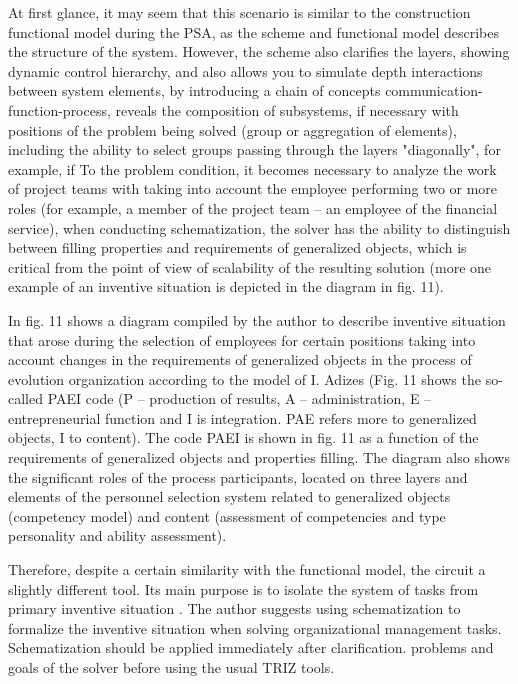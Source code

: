 At first glance, it may seem that this scenario is similar to the construction
functional model during the PSA, as the scheme and functional model describes
the structure of the system. However, the scheme also clarifies the layers,
showing dynamic control hierarchy, and also allows you to simulate depth
interactions between system elements, by introducing a chain of concepts
communication-function-process, reveals the composition of subsystems, if
necessary with positions of the problem being solved (group or aggregation of
elements), including the ability to select groups passing through the layers
"diagonally", for example, if To the problem condition, it becomes necessary
to analyze the work of project teams with taking into account the employee
performing two or more roles (for example, a member of the project team -- an
employee of the financial service), when conducting schematization, the solver
has the ability to distinguish between filling properties and requirements of
generalized objects, which is critical from the point of view of scalability
of the resulting solution (more one example of an inventive situation is
depicted in the diagram in fig. 11).


In fig. 11 shows a diagram compiled by the author to describe inventive
situation that arose during the selection of employees for certain positions
taking into account changes in the requirements of generalized objects in the
process of evolution organization according to the model of I. Adizes (Fig. 11
shows the so-called PAEI code (P -- production of results, A --
administration, E -- entrepreneurial function and I is integration. PAE refers
more to generalized objects, I to content). The code PAEI is shown in fig. 11
as a function of the requirements of generalized objects and properties
filling. The diagram also shows the significant roles of the process
participants, located on three layers and elements of the personnel selection
system related to generalized objects (competency model) and content
(assessment of competencies and type personality and ability assessment).

Therefore, despite a certain similarity with the functional model, the circuit
a slightly different tool. Its main purpose is to isolate the system of tasks
from primary inventive situation . The author suggests using schematization to
formalize the inventive situation when solving organizational management
tasks. Schematization should be applied immediately after clarification.
problems and goals of the solver before using the usual TRIZ tools.

